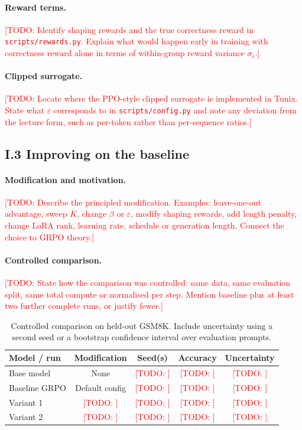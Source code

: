 \documentclass[11pt,a4paper]{article}
\newcommand{\code}[1]{\texttt{#1}}
\newcommand{\TODO}[1]{\textcolor{red}{[TODO: #1]}}
\begin{document}
\paragraph{Reward terms.}
\TODO{Identify shaping rewards and the true correctness reward in \code{scripts/rewards.py}. Explain what would happen early in training with correctness reward alone in terms of within-group reward variance $\sigma_r$.}

\paragraph{Clipped surrogate.}
\TODO{Locate where the PPO-style clipped surrogate is implemented in Tunix. State what $\varepsilon$ corresponds to in \code{scripts/config.py} and note any deviation from the lecture form, such as per-token rather than per-sequence ratios.}

\subsection*{I.3 Improving on the baseline}

\paragraph{Modification and motivation.}
\TODO{Describe the principled modification. Examples: leave-one-out advantage, sweep $K$, change $\beta$ or $\varepsilon$, modify shaping rewards, add length penalty, change LoRA rank, learning rate, schedule or generation length. Connect the choice to GRPO theory.}

\paragraph{Controlled comparison.}
\TODO{State how the comparison was controlled: same data, same evaluation split, same total compute or normalised per step. Mention baseline plus at least two further complete runs, or justify fewer.}

\begin{table}[H]
    \centering
    \caption{Controlled comparison on held-out GSM8K. Include uncertainty using a second seed or a bootstrap confidence interval over evaluation prompts.}
    \label{tab:controlled-comparison}
    \begin{tabular}{lcccc}
        \toprule
        Model / run & Modification & Seed(s) & Accuracy & Uncertainty \\
        \midrule
        Base model & None & \TODO{} & \TODO{} & \TODO{} \\
        Baseline GRPO & Default config & \TODO{} & \TODO{} & \TODO{} \\
        Variant 1 & \TODO{} & \TODO{} & \TODO{} & \TODO{} \\
        Variant 2 & \TODO{} & \TODO{} & \TODO{} & \TODO{} \\
        \bottomrule
    \end{tabular}
\end{table}
\end{document}

